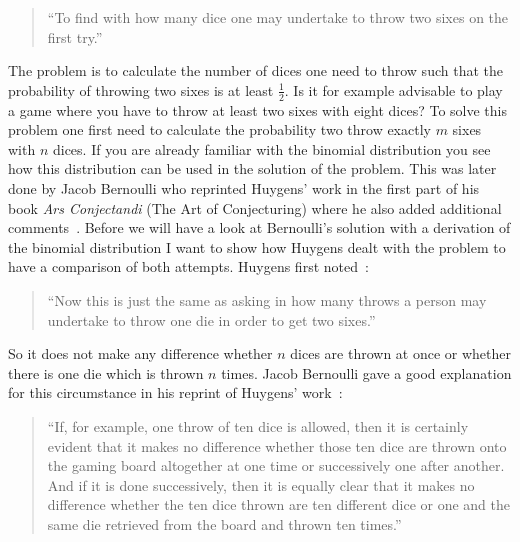 \begin{quote}
  ``To find with how many dice one may undertake to throw two sixes on the first try.''
\end{quote}


The problem is to calculate the number of dices one need to throw such that the probability of throwing two sixes is at least $\tfrac 12$. Is it for example advisable to play a game where you have to throw at least two sixes with eight dices? To solve this problem one first need to calculate the probability two throw exactly $m$ sixes with $n$ dices. If you are already familiar with the binomial distribution you see how this distribution can be used in the solution of the problem. This was later done by Jacob Bernoulli who reprinted Huygens' work in the first part of his book \emph{Ars Conjectandi} (The Art of Conjecturing) where he also added additional comments~\cite[p. 63]{bernoulli}. Before we will have a look at Bernoulli's solution with a derivation of the binomial distribution I want to show how Huygens dealt with the problem to have a comparison of both attempts. Huygens first noted~\cite[p. 163]{bernoulli}:

\begin{quote}
  ``Now this is just the same as asking in how many throws a person may undertake to throw one die in order to get two sixes.''
\end{quote}

So it does not make any difference whether $n$ dices are thrown at once or whether there is one die which is thrown $n$ times. Jacob Bernoulli gave a good explanation for this circumstance in his reprint of Huygens' work~\cite[p. 163]{bernoulli}:

\begin{quote}
  ``If, for example, one throw of ten dice is allowed, then it is certainly evident that it makes no difference whether those ten dice are thrown onto the gaming board altogether at one time or successively one after another. And if it is done successively, then it is equally clear that it makes no difference whether the ten dice thrown are ten different dice or one and the same die retrieved from the board and thrown ten times.''
\end{quote}

